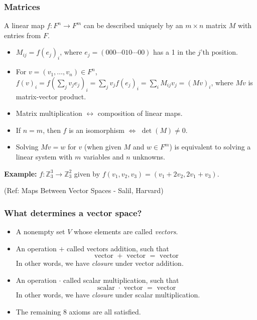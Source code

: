\begin{frame}[fragile]
\frametitle{Matrices}

 A linear map $f : F^n \rightarrow F^m$ can be described uniquely by an $m\times n$ matrix $M$ with entries from $F$.
\begin{itemize}
\item $M_{ij} = f(e_j)_i$, where $e_j=(000\cdots 010\cdots 00)$ has a 1 in the $j$'th position.
\item For $v=(v_1,\ldots,v_n)\in F^n$, $f(v)_i = f(\sum_j v_je_j)_i = \sum_j v_jf(e_j)_i = \sum_i M_{ij}v_j = (Mv)_i$, where $Mv$ is matrix-vector product.
\item Matrix multiplication $\leftrightarrow$ composition of linear maps.
\item If $n=m$, then $f$ is an isomorphism $\Leftrightarrow$ $\det(M)\neq 0$.
\item Solving $Mv=w$ for $v$ (when given $M$ and $w\in F^m$) is equivalent to solving a linear system with $m$ variables and $n$ unknowns.
\end{itemize}

 \textbf{Example:} $f : {\mathbb Z}_3^3\rightarrow {\mathbb Z}_3^2$ given by $f(v_1,v_2,v_3)=(v_1+2v_2,2v_1+v_3)$.
 
 
\tiny{(Ref: Maps Between Vector Spaces - Salil, Harvard)}
\end{frame}





\begin{frame}[fragile]
\frametitle{What determines a vector space?}

\begin{itemize}
\item A nonempty set $V$ whose elements are called {\em vectors}.
\item An operation $+$ called vectors addition, such that $$ \text{ vector } + \text{ vector } = \text{ vector }$$ 
In other words, we have {\em closure} under vector addition.
\item An operation $\cdot$ called scalar multiplication, such that $$ \text{ scalar } \cdot \text{ vector } = \text{ vector }$$ 
In other words, we have {\em closure} under scalar multiplication.
\item The remaining 8 axioms are all satisfied. 
\end{itemize}
\end{frame}


